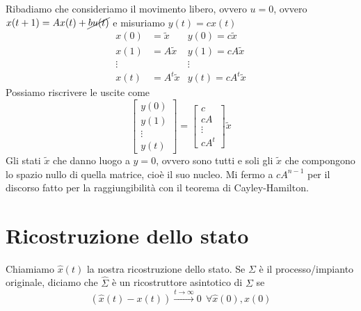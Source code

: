 \documentclass[10pt,a4paper]{book}
\begin{document}
Ribadiamo che consideriamo il movimento libero, ovvero $u=0$, ovvero $x( t+1) =Ax( t) +\cancel{bu( t)}$ e misuriamo $y( t) =cx( t)$
\begin{equation*}
\begin{aligned}
x( 0) & =\tilde{x} & y( 0) =c\tilde{x}\\
x( 1) & =A\tilde{x} & y( 1) =cA\tilde{x}\\
\vdots  &  & \vdots \\
x( t) & =A^{t}\tilde{x} & y( t) =cA^{t}\tilde{x}
\end{aligned}
\end{equation*}
Possiamo riscrivere le uscite come
\begin{equation*}
\begin{bmatrix}
y( 0)\\
y( 1)\\
\vdots \\
y( t)
\end{bmatrix} =\begin{bmatrix}
c\\
cA\\
\vdots \\
cA^{t}
\end{bmatrix}\tilde{x}
\end{equation*}
Gli stati $\tilde{x}$ che danno luogo a $y=0$, ovvero sono tutti e soli gli $\tilde{x}$ che compongono lo spazio nullo di quella matrice, cioè il suo nucleo. Mi fermo a $cA^{n-1}$ per il discorso fatto per la raggiungibilità con il teorema di Cayley-Hamilton.
\section{Ricostruzione dello stato}

Chiamiamo $\hat{x}( t)$ la nostra ricostruzione dello stato. Se $\Sigma $ è il processo/impianto originale, diciamo che $\hat{\Sigma }$ è un ricostruttore asintotico di $\Sigma $ se
\begin{equation*}
(\hat{x}( t) -x( t))\xrightarrow{t\rightarrow \infty } 0\ \ \forall \hat{x}( 0) ,x( 0)
\end{equation*}
\end{document}
